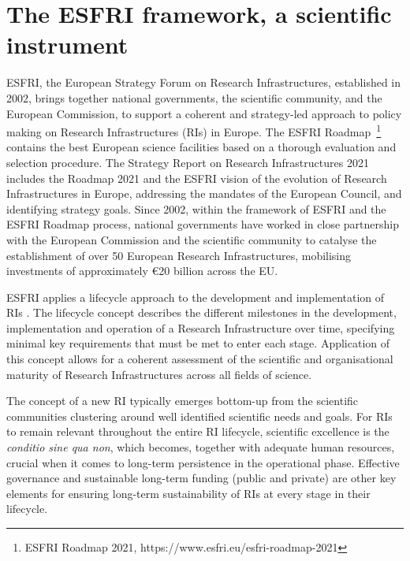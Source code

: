 \section{The ESFRI framework, a scientific instrument}
\label{section:The ESFRI framework}


ESFRI, the European Strategy Forum on Research Infrastructures, established in 2002, brings together national governments, the scientific community, and the European Commission, to support a coherent and strategy-led approach to policy making on Research Infrastructures (RIs) in Europe. The ESFRI Roadmap~\footnote{ESFRI Roadmap 2021, https://www.esfri.eu/esfri-roadmap-2021} contains the best European science facilities based on a thorough evaluation and selection procedure. The Strategy Report on Research Infrastructures 2021 includes the Roadmap 2021 and the ESFRI vision of the evolution of Research Infrastructures in Europe, addressing the mandates of the European Council, and identifying strategy goals. Since 2002, within the framework of ESFRI and the ESFRI Roadmap process, national governments have worked in close partnership with the European Commission and the scientific community to catalyse the establishment of over 50 European Research Infrastructures, mobilising investments of approximately €20 billion across the EU.

ESFRI applies a lifecycle approach to the development and implementation of RIs . The lifecycle concept describes the different milestones in the development, implementation and operation of a Research Infrastructure over time, specifying minimal key requirements that must be met to enter each stage. Application of this concept allows for a coherent assessment of the scientific and organisational maturity of Research Infrastructures across all fields of science.


The concept of a new RI typically emerges bottom-up from the scientific communities clustering around well identified scientific needs and goals. For RIs to remain relevant throughout the entire RI lifecycle, scientific excellence is the \emph{conditio sine qua non}, which becomes, together with adequate human resources, crucial when it comes to long-term persistence in the operational phase. Effective governance and sustainable long-term funding (public and private) are other key elements for ensuring long-term sustainability of RIs at every stage in their lifecycle. 

